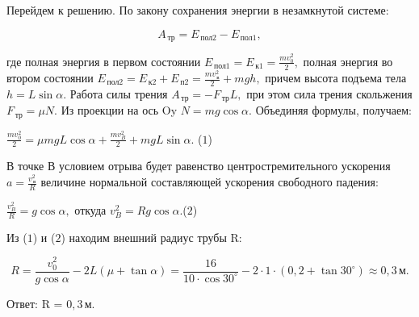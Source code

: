 \documentclass[12pt,a4paper]{article}
\begin{document}
{Перейдем к решению. 
По закону сохранения энергии в незамкнутой системе:

\[A_{\,\text{тр}}= E_{\,\text{пол}2} - E_{\,\text{пол}1},\]

где полная энергия в первом состоянии $E_{\,\text{пол}1}=E_{\,\text{к}1}= \frac{m v _0 ^2}{2} ,$ полная энергия во втором состоянии $E_{\,\text{пол}2}=E_{\,\text{к}2} + E_{\,\text{п}2}= \frac{m v _{\,\text{в}} ^2}{2} + mgh,$ причем высота подъема тела $h=L \sin \alpha .$ Работа силы трения $A_{\,\text{тр}}= - F_{\,\text{тр}}L,$ при этом сила трения скольжения $F_{\,\text{тр}}=\mu N.$ Из проекции на ось Oy $N=mg \cos \alpha .$
Объединяя формулы, получаем:

$\frac{m v _0 ^2}{2} =\mu mgL \cos \alpha + \frac{m v _B ^2}{2} + mgL \sin \alpha .$ ($1$)

В точке В условием отрыва будет равенство центростремительного ускорения $a= \frac{v _{\,\text{в}} ^2}{R}$ величине нормальной составляющей ускорения свободного падения:

$\frac{v _B ^2}{R} =g \cos \alpha ,$  откуда $v _B ^2 =Rg \cos \alpha .$($2$)

Из ($1$) и ($2$) находим внешний радиус трубы R:

\[R= \frac{v _0 ^2}{g \cos \alpha} - 2L ( \mu + \tan \alpha ) = \frac{16}{10 \cdot \cos 30 ^\circ} - 2 \cdot 1 \cdot ( 0{,}2 + \tan 30 ^\circ ) \approx 0{,}3\,\text{м}.\]

Ответ: R  =  $0{,}3\,\text{м}$.
}
\end{document}

